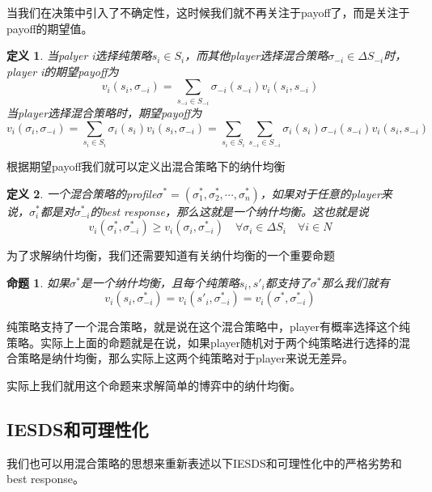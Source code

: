 \documentclass[UTF8,12pt]{ctexart}
\newtheorem{Def}{定义}[section]
\newtheorem{Prop}{命题}[section]
\numberwithin{equation}{section} %
\numberwithin{figure}{section}
\numberwithin{table}{section}
\begin{document}
	当我们在决策中引入了不确定性，这时候我们就不再关注于payoff了，而是关注于payoff的期望值。
	\begin{Def}
		当palyer i选择纯策略$s_i \in S_i$，而其他player选择混合策略$\sigma_{-i} \in \Delta S_{-i}$时，player i的期望payoff为
		\begin{equation}
			v_i(s_i,\sigma_{-i}) = \sum_{s_{-i} \in S_{-i}} \sigma_{-i}(s_{-i})v_i(s_i,s_{-i})
		\end{equation}
		当player选择混合策略时，期望payoff为
		\begin{equation}
			v_i(\sigma_i,\sigma_{-i}) = \sum_{s_{i} \in S_{i}}\sigma_i(s_i)v_i(s_i,\sigma_{-i}) = \sum_{s_{i} \in S_{i}}\sum_{s_{-i} \in S_{-i}} \sigma_i(s_i)\sigma_{-i}(s_{-i})v_i(s_i,s_{-i})
		\end{equation}
	\end{Def}
	
	根据期望payoff我们就可以定义出混合策略下的纳什均衡
	\begin{Def}
		一个混合策略的profile$\sigma^* = (\sigma^*_1,\sigma^*_2,\cdots,\sigma^*_n)$，如果对于任意的player来说，$\sigma^*_i$都是对$\sigma^*_{-i}$的best response，那么这就是一个纳什均衡。这也就是说
		\begin{equation}
			v_i(\sigma^*_i,\sigma^*_{-i}) \geqslant v_i(\sigma_i,\sigma^*_{-i}) \quad \forall \sigma_i \in \Delta S_i \quad \forall i \in N
		\end{equation}
	\end{Def}
	
	为了求解纳什均衡，我们还需要知道有关纳什均衡的一个重要命题
	\begin{Prop}
		如果$\sigma^*$是一个纳什均衡，且每个纯策略$s_i,s'_i$都支持了$\sigma^*$那么我们就有
		\begin{equation}
			v_i(s_i,\sigma^*_{-i}) = v_i(s'_i,\sigma^*_{-i}) = v_i(\sigma^*,\sigma^*_{-i})
		\end{equation}
	\end{Prop}
	纯策略支持了一个混合策略，就是说在这个混合策略中，player有概率选择这个纯策略。实际上上面的命题就是在说，如果player随机对于两个纯策略进行选择的混合策略是纳什均衡，那么实际上这两个纯策略对于player来说无差异。
	
	实际上我们就用这个命题来求解简单的博弈中的纳什均衡。
	
	\subsection{IESDS和可理性化}
	我们也可以用混合策略的思想来重新表述以下IESDS和可理性化中的严格劣势和best response。
	
\end{document}

